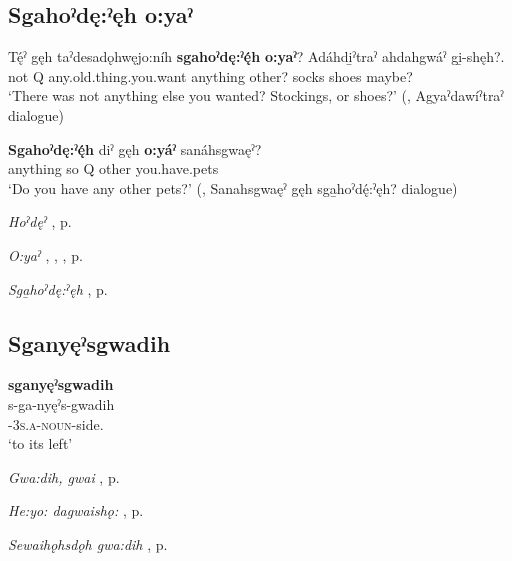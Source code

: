 \subsection*{\textbf{Sgahoˀdę:ˀęh o:yaˀ} } \label{p:[sgahoˀdę:ˀęh o:yaˀ]}

\ea
\label{ex:spart9}
\gll Tę́ˀ gęh taˀdesadǫhwęjo:níh \textbf{sgahoˀdę:ˀę́h} \textbf{o:yaˀ}? Adáhdi̱ˀtraˀ ahdahgwáˀ gi̱-shęh?.\\
not Q any.old.thing.you.want anything other? socks shoes maybe?\\
\glt ‘There was not anything else you wanted? Stockings, or shoes?’ (\cite[225]{mithun_watewayestanih_1984}, Agyaˀdawíˀtraˀ dialogue)
\z

\ea
\label{ex:spart10}
\gll \textbf{Sgahoˀdę:ˀę́h} diˀ gęh \textbf{o:yáˀ} sanáhsgwaęˀ?\\
anything so Q other you.have.pets\\
\glt ‘Do you have any other pets?’ (\cite[317]{mithun_watewayestanih_1984}, Sanahsgwaęˀ gęh sga̱hoˀdę́:ˀęh? dialogue)
\z

\begin{CayugaRelated}
\item \textit{Hoˀdęˀ} , p. \pageref{p:[hoˀdęˀ]}\\
\item \textit{O:yaˀ} , , , p. \pageref{p:[o:yaˀ]}\\
\item \textit{Sga̱hoˀdę:ˀęh} , p. \pageref{p:[sgahoˀdę:ˀęh]}
\end{CayugaRelated}

\subsection*{\textbf{Sganyęˀsgwadih} } \label{p:[sganyęˀsgwadih]}

\ea
\label{ex:spart401}
\glll \textbf{sganyęˀsgwadih} {}\\
s-ga-nyęˀs-gwadih\\
\textsc{\repetitive-3s.a-noun}-side.{\stative}\\
\glt ‘to its left’
\z

\begin{CayugaRelated}
\item \textit{Gwa:dih, gwai} , p. \pageref{p:[gwa:dih]}\\
\item \textit{He:yo: dagwaishǫ:} , p. \pageref{p:[he:yo: dagwaishǫ:]}\\
\item \textit{Sewaihǫhsdǫh gwa:dih} , p. \pageref{p:[sewaihǫhsdǫh gwa:dih]}
\end{CayugaRelated}

